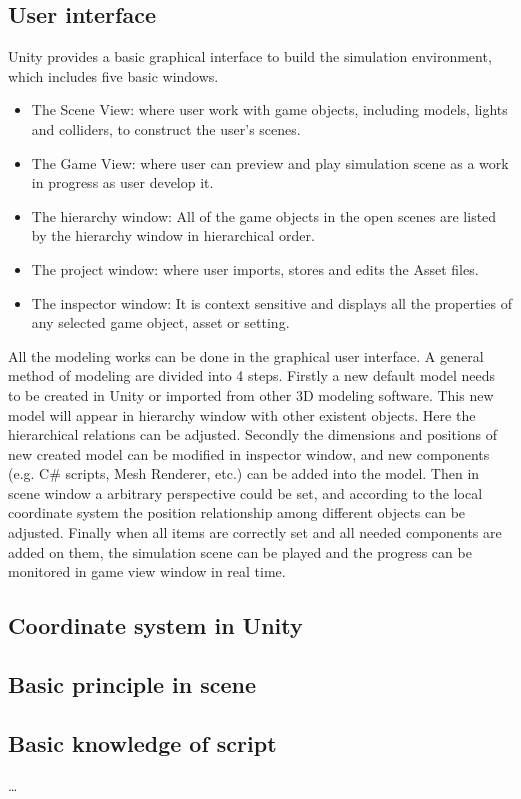 \subsection{User interface}
Unity provides a basic graphical interface to build the simulation environment, which includes five basic windows. 
\begin{itemize}
	\item The Scene View: where user work with game objects, including models, lights and colliders, to construct the user's scenes. 
	\item The Game View: where user can preview and play simulation scene as a work in progress as user develop it.
	\item The hierarchy window: All of the game objects in the open scenes are listed by the hierarchy window in hierarchical order.
	\item The project window: where user imports, stores and edits the Asset files. 
	\item The inspector window: It is context sensitive and displays all the properties of any selected game object, asset or setting.
\end{itemize} 
All the modeling works can be done in the graphical user interface. A general method of modeling are divided into 4 steps. Firstly a new default model needs to be created in Unity or imported from other 3D modeling software. This new model will appear in hierarchy window with other existent objects. Here the hierarchical relations can be adjusted. Secondly the dimensions and positions of new created model can be modified in inspector window, and new components (e.g. C\# scripts, Mesh Renderer, etc.) can be added into the model. Then in scene window a arbitrary perspective could be set, and according to the local coordinate system the position relationship among different objects can be adjusted. Finally when all items are correctly set and all needed components are added on them, the simulation scene can be played and the progress can be monitored in game view window in real time.
\subsection{Coordinate system in Unity}

\subsection{Basic principle in scene}
\subsection{Basic knowledge of script}

\dots
